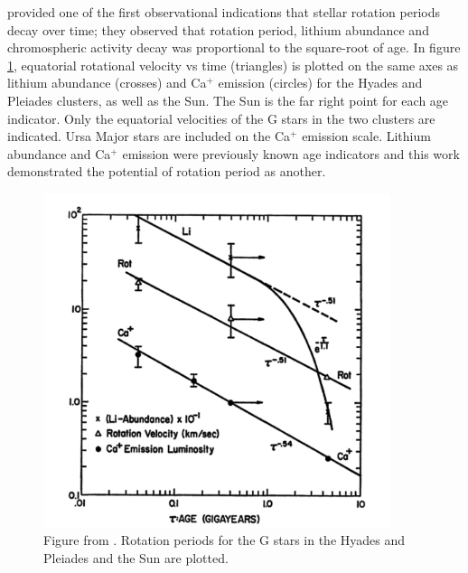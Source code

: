 \citet{Skumanich1972} provided one of the first observational indications that
stellar rotation periods decay over time; they observed that rotation period,
lithium abundance and chromospheric activity decay was proportional to the
square-root of age.
In figure \ref{fig:skumanich}, equatorial rotational velocity vs time
(triangles) is plotted on the same axes as lithium abundance (crosses) and
Ca$^+$ emission (circles) for the Hyades and Pleiades clusters, as well as the
Sun.
The Sun is the far right point for each age indicator.
Only the equatorial velocities of the G stars in the two clusters are
indicated.
Ursa Major stars are included on the Ca$^+$ emission scale.
Lithium abundance and Ca$^+$ emission were previously known age indicators and
this work demonstrated the potential of rotation period as another.

\begin{figure}
\begin{center}
\includegraphics[width=4in, clip=true]{figures/skumanich.pdf}
\caption[\citet{skumanich1972} results: early evidence for magnetic braking]
{Figure from \citet{skumanich1972}. Rotation periods for the G stars in the
Hyades and Pleiades and the Sun are plotted.}
\label{fig:skumanich}
\end{center}
\end{figure}

